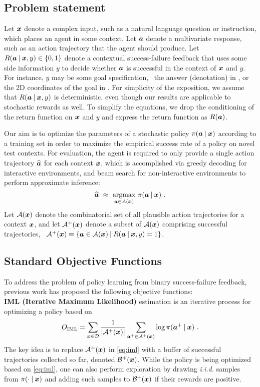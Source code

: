 \subsection{Problem statement}

Let ${\bm{x}}$ denote a complex input, such as a natural language question
or instruction, which places an agent in some context.  Let ${\bm{a}}$
denote a multivariate response, such as an action trajectory that the
agent should produce. Let $R({\bm{a}} \:\vert\: {\bm{x}}, y) \in \{0, 1\}$ denote a
contextual success-failure feedback that uses some side information
$y$ to decide whether ${\bm{a}}$ is successful in the context of ${\bm{x}}$ and
$y$. For instance, $y$ may be some goal specification, \eg~the answer
(denotation) in , or the 2D coordinates of the goal in
. For simplicity of the exposition, we assume that
$R({\bm{a}} \:\vert\: {\bm{x}}, y)$ is deterministic, even though our results are
applicable to stochastic rewards as well.  To simplify the equations, we
drop the conditioning of the return function on ${\bm{x}}$ and $y$ and
express the return function as $R({\bm{a}})$.

Our aim is to optimize the parameters of a stochastic policy
$\pi({\bm{a}}\:\vert\: {\bm{x}})$ according to a training set in order to maximize the
empirical success rate of a policy on novel test contexts. For
evaluation, the agent is required to only provide a single action
trajectory $\widehat{{\bm{a}}}$ for each context ${\bm{x}}$, which is
accomplished via greedy decoding for interactive environments, and
beam search for non-interactive environments to perform approximate
inference:
\begin{equation}
\widehat{{\bm{a}}} ~\approx~\underset{{\bm{a}} \in \mathcal{A}({\bm{x}})}{\operatorname{argmax}}~{\pi({\bm{a}} \:\vert\: {\bm{x}})}~.
\end{equation}
Let $\mathcal{A}({\bm{x}})$ denote the combinatorial set of all plausible action
trajectories for a context ${\bm{x}}$, and let $\mathcal{A}^+({\bm{x}})$ denote a
subset of $\mathcal{A}({\bm{x}})$ comprising successful trajectories,
\ie~$\mathcal{A}^+({\bm{x}}) \equiv \{{\bm{a}} \in \mathcal{A}({\bm{x}}) \:\vert\: R({\bm{a}}\:\vert\: {\bm{x}}, y)
=1\}$.


\subsection{Standard Objective Functions}
To address the problem of policy learning from binary success-failure
feedback, previous work has proposed the following objective functions:\\[.3cm]
\triangle\textbf{IML (Iterative Maximum Likelihood)} estimation
\cite{liang2017nsm,pqt2018} is an iterative process for optimizing a
policy based on 
\begin{equation}
\displaystyle O_{\mathrm{IML}} = \sum_{{\bm{x}} \in {\mathcal{D}}} \frac{1}{\lvert \mathcal{A}^+({\bm{x}}) \rvert}\sum_{{\bm{a}^+} \in \mathcal{A}^+({\bm{x}})} \log \pi({\bm{a}^+}\:\vert\:{\bm{x}})~.
\label{eq:iml}
\end{equation}
The key idea is to replace $\mathcal{A}^+({\bm{x}})$ in \eqref{eq:iml} with a
buffer of successful trajectories collected so far, denoted
$\mathcal{B}^+({\bm{x}})$. While the policy is being optimized based on
\eqref{eq:iml}, one can also perform exploration by drawing {\em i.i.d.}
samples from $\pi(\cdot \:\vert\: {\bm{x}})$ and adding such samples to
$\mathcal{B}^+({\bm{x}})$ if their rewards are positive.

